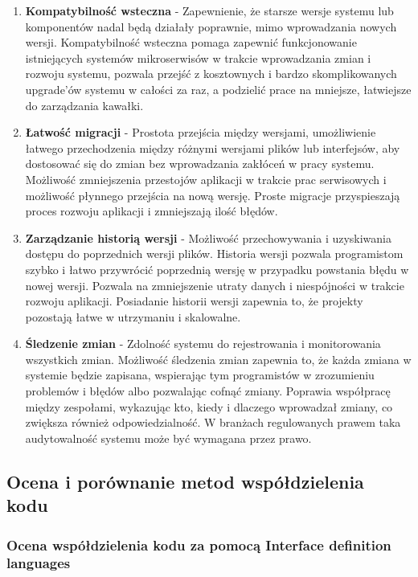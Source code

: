 \documentclass[runningheads,12pt]{llncs}
\begin{document}
\begin{enumerate}
    \item \textbf{Kompatybilność wsteczna} - Zapewnienie, że starsze wersje systemu lub komponentów nadal będą działały poprawnie, mimo wprowadzania nowych wersji. Kompatybilność wsteczna pomaga zapewnić funkcjonowanie istniejących systemów mikroserwisów w trakcie wprowadzania zmian i rozwoju systemu, pozwala przejść z kosztownych i bardzo skomplikowanych upgrade'ów systemu w całości za raz, a podzielić prace na mniejsze, łatwiejsze do zarządzania kawałki.  ~\cite[p. 75]{bloch2018effective}
    \item \textbf{Łatwość migracji} - Prostota przejścia między wersjami, umożliwienie łatwego przechodzenia między różnymi wersjami plików lub interfejsów, aby dostosować się do zmian bez wprowadzania zakłóceń w pracy systemu. Możliwość zmniejszenia przestojów aplikacji w trakcie prac serwisowych i możliwość płynnego przejścia na nową wersję. Proste migracje przyspieszają proces rozwoju aplikacji i zmniejszają ilość błędów. ~\cite[p. 78]{bloch2018effective}
    \item \textbf{Zarządzanie historią wersji} - Możliwość przechowywania i uzyskiwania dostępu do poprzednich wersji plików. Historia wersji pozwala programistom szybko i łatwo przywrócić poprzednią wersję w przypadku powstania błędu w nowej wersji. Pozwala na zmniejszenie utraty danych i niespójności w trakcie rozwoju aplikacji. Posiadanie historii wersji zapewnia to, że projekty pozostają łatwe w utrzymaniu i skalowalne. ~\cite[p. 150]{rubin2012essential}
    \item \textbf{Śledzenie zmian} - Zdolność systemu do rejestrowania i monitorowania wszystkich zmian. Możliwość śledzenia zmian zapewnia to, że każda zmiana w systemie będzie zapisana, wspierając tym programistów w zrozumieniu problemów i błędów albo pozwalając cofnąć zmiany. Poprawia współpracę między zespołami, wykazując kto, kiedy i dlaczego wprowadzał zmiany, co zwiększa również odpowiedzialność. W branżach regulowanych prawem taka audytowalność systemu może być wymagana przez prawo. ~\cite[p. 150]{rubin2012essential}
\end{enumerate}

\subsection{Ocena i porównanie metod współdzielenia kodu}

\subsubsection{Ocena współdzielenia kodu za pomocą Interface definition languages}
\end{document}
